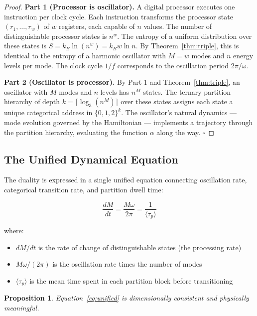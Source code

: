 \documentclass[12pt,twocolumn]{article}
\newtheorem{proposition}[theorem]{Proposition}
\begin{document}
\begin{proof}
\textbf{Part 1 (Processor is oscillator).} A digital processor executes one instruction per clock cycle. Each instruction transforms the processor state $(r_1, \ldots, r_w)$ of $w$ registers, each capable of $n$ values. The number of distinguishable processor states is $n^w$. The entropy of a uniform distribution over these states is $S = k_B \ln(n^w) = k_B w \ln n$. By Theorem~\ref{thm:triple}, this is identical to the entropy of a harmonic oscillator with $M = w$ modes and $n$ energy levels per mode. The clock cycle $1/f$ corresponds to the oscillation period $2\pi/\omega$.

\textbf{Part 2 (Oscillator is processor).} By Part 1 and Theorem~\ref{thm:triple}, an oscillator with $M$ modes and $n$ levels has $n^M$ states. The ternary partition hierarchy of depth $k = \lceil \log_3(n^M) \rceil$ over these states assigns each state a unique categorical address in $\{0,1,2\}^k$. The oscillator's natural dynamics --- mode evolution governed by the Hamiltonian --- implements a trajectory through the partition hierarchy, evaluating the function $\alpha$ along the way. $\square$
\end{proof}

\subsection{The Unified Dynamical Equation}

The duality is expressed in a single unified equation connecting oscillation rate, categorical transition rate, and partition dwell time:

\begin{equation}
\label{eq:unified}
\frac{dM}{dt} = \frac{M\omega}{2\pi} = \frac{1}{\langle\tau_p\rangle}
\end{equation}

where:
\begin{itemize}
\item $dM/dt$ is the rate of change of distinguishable states (the processing rate)
\item $M\omega/(2\pi)$ is the oscillation rate times the number of modes
\item $\langle\tau_p\rangle$ is the mean time spent in each partition block before transitioning
\end{itemize}

\begin{proposition}
Equation~\ref{eq:unified} is dimensionally consistent and physically meaningful.
\end{proposition}
\end{document}
